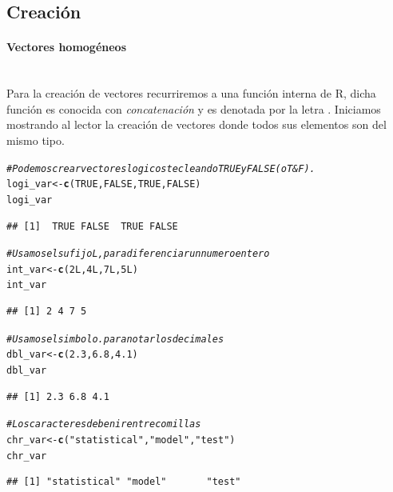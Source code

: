 \documentclass[11pt,a4paper,oneside]{book}\usepackage[]{graphicx}\usepackage[]{color}
\makeatletter
\newcommand{\hlnum}[1]{\textcolor[rgb]{0.686,0.059,0.569}{#1}}%
\newcommand{\hlstr}[1]{\textcolor[rgb]{0.192,0.494,0.8}{#1}}%
\newcommand{\hlcom}[1]{\textcolor[rgb]{0.678,0.584,0.686}{\textit{#1}}}%
\newcommand{\hlstd}[1]{\textcolor[rgb]{0.345,0.345,0.345}{#1}}%
\newcommand{\hlkwb}[1]{\textcolor[rgb]{0.69,0.353,0.396}{#1}}%
\newcommand{\hlkwd}[1]{\textcolor[rgb]{0.737,0.353,0.396}{\textbf{#1}}}%
\newenvironment{kframe}{%
 \def\at@end@of@kframe{}%
 \ifinner\ifhmode%
  \def\at@end@of@kframe{\end{minipage}}%
  \begin{minipage}{\columnwidth}%
 \fi\fi%
 \def\FrameCommand##1{\hskip\@totalleftmargin \hskip-\fboxsep
 \colorbox{shadecolor}{##1}\hskip-\fboxsep
     \hskip-\linewidth \hskip-\@totalleftmargin \hskip\columnwidth}%
 \MakeFramed {\advance\hsize-\width
   \@totalleftmargin\z@ \linewidth\hsize
   \@setminipage}}%
 {\par\unskip\endMakeFramed%
 \at@end@of@kframe}
\newenvironment{knitrout}{}{} %
\newcommand{\code}[1]{\fcolorbox{white}{gray!15}{#1}}
\makeatother
\begin{document}
\begin{itemize}
\subsection{Creación}

\paragraph{Vectores homogéneos}
~\\

Para la creación de vectores recurriremos a una función interna de R, dicha función es conocida con \emph{concatenación} y es denotada por la letra \code{\texttt{c()}}. Iniciamos mostrando al lector la creación de vectores donde todos sus elementos son del mismo tipo.

\begin{knitrout}
\color{fgcolor}\begin{kframe}
\begin{alltt}
\hlcom{# Podemos crear vectores logicos tecleando TRUE y FALSE (o T & F).}
\hlstd{logi_var} \hlkwb{<-} \hlkwd{c}\hlstd{(}\hlnum{TRUE}\hlstd{,} \hlnum{FALSE}\hlstd{,} \hlnum{TRUE}\hlstd{,} \hlnum{FALSE}\hlstd{)}
\hlstd{logi_var}
\end{alltt}
\begin{verbatim}
## [1]  TRUE FALSE  TRUE FALSE
\end{verbatim}
\begin{alltt}
\hlcom{# Usamos el sufijo L, para diferenciar un numero entero}
\hlstd{int_var} \hlkwb{<-} \hlkwd{c}\hlstd{(}\hlnum{2L}\hlstd{,} \hlnum{4L}\hlstd{,} \hlnum{7L}\hlstd{,} \hlnum{5L}\hlstd{)}
\hlstd{int_var}
\end{alltt}
\begin{verbatim}
## [1] 2 4 7 5
\end{verbatim}
\begin{alltt}
\hlcom{# Usamos el simbolo . para notar los decimales}
\hlstd{dbl_var} \hlkwb{<-} \hlkwd{c}\hlstd{(}\hlnum{2.3}\hlstd{,} \hlnum{6.8}\hlstd{,} \hlnum{4.1}\hlstd{)}
\hlstd{dbl_var}
\end{alltt}
\begin{verbatim}
## [1] 2.3 6.8 4.1
\end{verbatim}
\begin{alltt}
\hlcom{# Los caracteres deben ir entre comillas}
\hlstd{chr_var} \hlkwb{<-} \hlkwd{c}\hlstd{(}\hlstr{"statistical"}\hlstd{,} \hlstr{"model"}\hlstd{,} \hlstr{"test"}\hlstd{)}
\hlstd{chr_var}
\end{alltt}
\begin{verbatim}
## [1] "statistical" "model"       "test"
\end{verbatim}
\end{kframe}
\end{knitrout}


\end{itemize}
\end{document}
